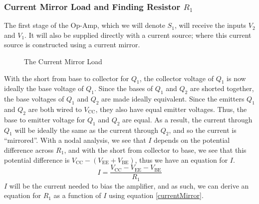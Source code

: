 \documentclass[lettersize,journal]{IEEEtran}
\begin{document}
\subsubsection{Current Mirror Load and Finding Resistor $R_1$}
The first stage of the Op-Amp, which we will denote $S_1$, 
will receive the inputs $V_2$ and $V_1$. It will also be 
supplied directly with a current source; where this current source 
is constructed using a current mirror.
\begin{figure}[H]
  \centering
  \caption{The Current Mirror Load}
\end{figure}
With the short from base to collector for $Q_1$, the 
collector voltage of $Q_1$ is now ideally the base voltage 
of $Q_1$. Since the bases of $Q_1$ and $Q_2$ are shorted together,
the base voltages of $Q_1$ and $Q_2$ are made ideally equivalent.
Since the emitters $Q_1$ and $Q_2$ are both wired to $V_{\text{CC}}$, 
they also have equal emitter voltages. Thus, the base to emitter 
voltage for $Q_1$ and $Q_2$ are equal. As a result, the current 
through $Q_1$ will be ideally the same as the current through 
$Q_2$, and so the current is ``mirrored''. With a nodal analysis, 
we see that $I$ depends on the potential difference across 
$R_1$, and with the short from collector to base, we see that 
this potential difference is $V_{\text{CC}} - (V_{\text{EE}} + V_{\text{BE}})$, 
thus we have an equation for $I$.
\begin{equation}
\label{currentMirror}
I = \frac{V_{\text{CC}} - V_{\text{EE}} - V_{\text{BE}}}{R_1} %
\end{equation}
$I$ will be the current needed to bias the amplifier, and as such, 
we can derive an equation for $R_1$ as a function of $I$ using equation 
\ref{currentMirror}.
\end{document}
